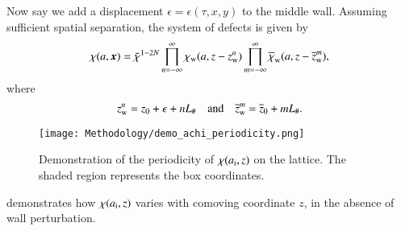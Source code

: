     Now say we add a displacement $\epsilon= \epsilon(\tau, x, y)$ to the middle wall. %
    Assuming sufficient spatial separation, the system of defects is given by
    \begin{equation}
        \chi(a,\boldsymbol{x}) = \breve{\chi}^{1-2N}\prod_{n= -\infty}^\infty \chi_\mathrm{w}(a, z- z_\mathrm{w}^{n} )\prod_{m=-\infty}^{\infty} {\overline{\chi}_\mathrm{w}(a, z-\overline{z}_\mathrm{w}^m) },
    \end{equation}
    where
    \begin{equation}\label{eq:PT:gwas:wall_antiwall_positions}
        z\ped{w}^n = z_0 + \epsilon + nL_\# %
        \quad\text{and}\quad %
        \widebar{z}\ped{w}^m = \widebar{z}_0+ mL_\#.
    \end{equation}
    \begin{figure}[h]
        \centering
        \texttt{[image: Methodology/demo\_achi\_periodicity.png]}
        \caption{Demonstration of the periodicity of $\chi(a_\mathrm{i},z)$ on the lattice. The shaded region represents the box coordinates.
        }\label{fig:PT:gwas:demo_achi_periodicity}
    \end{figure}
     demonstrates how $\chi(a_\mathrm{i}, z)$ varies with comoving coordinate $z$, in the absence of wall perturbation.
    
